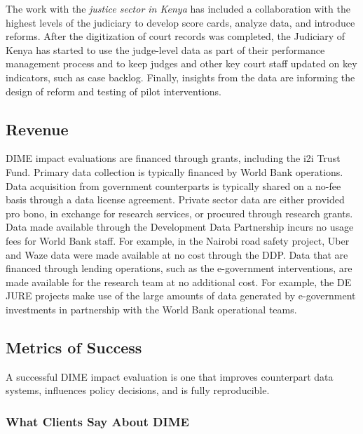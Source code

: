 The work with the \emph{justice sector in Kenya} has included a collaboration with the highest levels of the judiciary to develop score cards, analyze data, and introduce reforms. After the digitization of court records was completed, the Judiciary of Kenya has started to use the judge-level data as part of their performance management process and to keep judges and other key court staff updated on key indicators, such as case backlog. Finally, insights from the data are informing the design of reform and testing of pilot interventions.

\hypertarget{revenue-5}{%
\subsection{Revenue}\label{revenue-5}}

DIME impact evaluations are financed through grants, including the i2i Trust Fund. Primary data collection is typically financed by World Bank operations. Data acquisition from government counterparts is typically shared on a no-fee basis through a data license agreement. Private sector data are either provided pro bono, in exchange for research services, or procured through research grants. Data made available through the Development Data Partnership incurs no usage fees for World Bank staff. For example, in the Nairobi road safety project, Uber and Waze data were made available at no cost through the DDP. Data that are financed through lending operations, such as the e-government interventions, are made available for the research team at no additional cost. For example, the DE JURE projects make use of the large amounts of data generated by e-government investments in partnership with the World Bank operational teams.

\hypertarget{metrics-of-success-5}{%
\subsection{Metrics of Success}\label{metrics-of-success-5}}

A successful DIME impact evaluation is one that improves counterpart data systems, influences policy decisions, and is fully reproducible.

\hypertarget{what-clients-say-about-dime}{%
\subsubsection*{What Clients Say About DIME}\label{what-clients-say-about-dime}}

